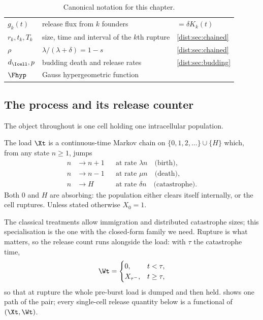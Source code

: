 \begin{table}[tbp]
\begin{tabular}{@{}llp{}@{}}
$g_k(t)$ & release flux from $k$ founders & $=\delta K_k(t)$ \\
$r_k,t_k,T_k$ & size, time and interval of the $k$th rupture & \cref{dist:sec:chained} \\
$\rho$ & $\lambda/(\lambda+\delta)=1-s$ & \cref{dist:sec:chained} \\
$d_{\Icell},p$ & budding death and release rates & \cref{dist:sec:budding} \\
$\Fhyp$ & Gauss hypergeometric function & \\
\bottomrule
\end{tabular}
\caption{Canonical notation for this chapter.}
\label{dist:tab:notation}
\end{table}

\subsection{The process and its release counter}
\label{dist:sec:process}

The object throughout is one cell holding one intracellular population.

\begin{definition}
\label{dist:def:bdc}
The load $\Xt$ is a continuous-time Markov chain on
$\{0,1,2,\ldots\}\cup\{H\}$ which, from any state $n\ge1$, jumps
\begin{align*}
n &\to n+1 &&\text{at rate } \lambda n \quad\text{(birth)},\\
n &\to n-1 &&\text{at rate } \mu n \quad\text{(death)},\\
n &\to H &&\text{at rate } \delta n \quad\text{(catastrophe)}.
\end{align*}
Both $0$ and $H$ are absorbing: the population either clears itself
internally, or the cell ruptures. Unless stated otherwise $X_0=1$.
\end{definition}

The classical treatments
\cite{brockwell1982birth,karlin1982linear,di2008note} allow immigration and
distributed catastrophe sizes; this specialisation is the one with the
closed-form family we need. Rupture is what matters, so the release count runs
alongside the load: with $\tau$ the catastrophe time,
\begin{equation}
\Wt = \begin{cases}
0, & t<\tau,\\
X_{\tau^-}, & t\ge\tau,
\end{cases}
\label{dist:eq:wdef}
\end{equation}
so that at rupture the whole pre-burst load is dumped and then held.
 shows one path of the pair; every single-cell release
quantity below is a functional of $(\Xt,\Wt)$.

